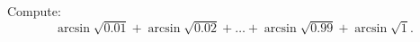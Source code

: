 Compute: \[\arcsin{\sqrt{0.01}}+\arcsin{\sqrt{0.02}}+\ldots+\arcsin{\sqrt{0.99}}+\arcsin{\sqrt{1}}.\]
